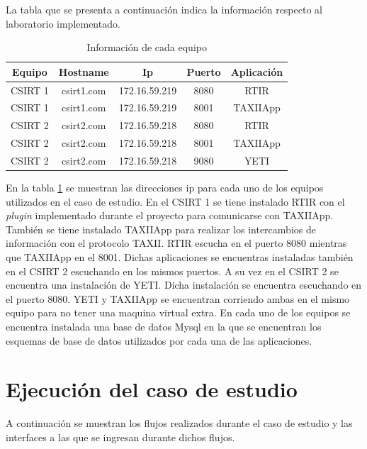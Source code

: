 La tabla que se presenta a continuación indica la información respecto al laboratorio implementado.
\renewcommand{\tablename}{Tabla}

\begin{table}
	\begin{center}
		\begin{tabular}{|c|c|c|c|c|}
			\hline
			Equipo & Hostname & Ip & Puerto & Aplicación \\ \hline
			CSIRT 1 & csirt1.com & 172.16.59.219 & 8080 & RTIR \\ \hline
			CSIRT 1 & csirt1.com & 172.16.59.219 & 8001 & TAXIIApp \\ \hline
			CSIRT 2 & csirt2.com & 172.16.59.218 & 8080 & RTIR \\ \hline
			CSIRT 2 & csirt2.com & 172.16.59.218 & 8001 & TAXIIApp \\ \hline
			CSIRT 2 & csirt2.com & 172.16.59.218 & 9080 & YETI \\ \hline
		\end{tabular}
	\end{center}
	\caption{Información de cada equipo}
	\label{tabla_equipos}
\end{table}

En la tabla \ref{tabla_equipos} se muestran las direcciones ip para cada uno de los equipos utilizados en el caso de estudio. En el CSIRT 1 se tiene instalado RTIR con el \textit{plugin} implementado durante el proyecto para comunicarse con TAXIIApp. También se tiene instalado TAXIIApp para realizar los intercambios de información con el protocolo TAXII. RTIR escucha en el puerto 8080 mientras que TAXIIApp en el 8001.
Dichas aplicaciones se encuentras instaladas también en el CSIRT 2 escuchando en los mismos puertos. A su vez en el CSIRT 2 se encuentra una instalación de YETI. Dicha instalación se encuentra escuchando en el puerto 8080. YETI y TAXIIApp se encuentran corriendo ambas en el mismo equipo para no tener una maquina virtual extra.
En cada uno de los equipos se encuentra instalada una base de datos Mysql en la que se encuentran los esquemas de base de datos utilizados por cada una de las aplicaciones.

\section{Ejecución del caso de estudio}

A continuación se muestran los flujos realizados durante el caso de estudio y las interfaces a las que se ingresan durante dichos flujos.

